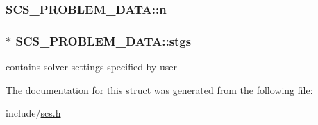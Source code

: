 \hypertarget{struct_s_c_s___p_r_o_b_l_e_m___d_a_t_a_a390ecc6e49d9983503a57fac9f7fb4d5}{
\subsubsection[{n}]{ S\-C\-S\-\_\-\-P\-R\-O\-B\-L\-E\-M\-\_\-\-D\-A\-T\-A\-::n}}\label{struct_s_c_s___p_r_o_b_l_e_m___d_a_t_a_a390ecc6e49d9983503a57fac9f7fb4d5}
\hypertarget{struct_s_c_s___p_r_o_b_l_e_m___d_a_t_a_a14bfc0a349fe9be30059e55c4ba0066f}{
\subsubsection[{stgs}]{$\ast$ S\-C\-S\-\_\-\-P\-R\-O\-B\-L\-E\-M\-\_\-\-D\-A\-T\-A\-::stgs}}\label{struct_s_c_s___p_r_o_b_l_e_m___d_a_t_a_a14bfc0a349fe9be30059e55c4ba0066f}
contains solver settings specified by user 

The documentation for this struct was generated from the following file\-:\begin{DoxyCompactItemize}
\item 
include/\hyperlink{scs_8h}{scs.\-h}\end{DoxyCompactItemize}
